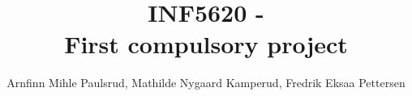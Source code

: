 \documentclass[a4paper, english,10pt]{article}
\begin{document}
\title{INF5620 - \\  First compulsory project}
\author{Arnfinn Mihle Paulsrud, Mathilde Nygaard Kamperud, Fredrik Eksaa Pettersen}
\maketitle







\end{document}
